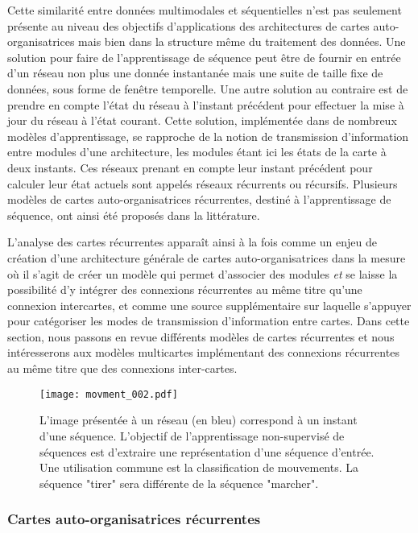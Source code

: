 \documentclass[../main]{subfiles}
\begin{document}
{Cette similarité entre données multimodales et séquentielles n'est pas seulement présente au niveau des objectifs d'applications des architectures de cartes auto-organisatrices mais bien dans la structure même du traitement des données. 
Une solution pour faire de l'apprentissage de séquence peut être de fournir en entrée d'un réseau non plus une donnée instantanée mais une suite de taille fixe de données, sous forme de fenêtre temporelle.
Une autre solution au contraire est de prendre en compte l'état du réseau à l'instant précédent pour effectuer la mise à jour du réseau à l'état courant. Cette solution, implémentée dans de nombreux modèles d'apprentissage, se rapproche de la notion de transmission d'information entre modules d'une architecture, les modules étant ici les états de la carte à deux instants. 
Ces réseaux prenant en compte leur instant précédent pour calculer leur état actuels sont appelés réseaux récurrents ou récursifs.
Plusieurs modèles de cartes auto-organisatrices récurrentes, destiné à l'apprentissage de séquence, ont ainsi été proposés dans la littérature.


L'analyse des cartes récurrentes apparaît ainsi à la fois comme un enjeu de création d'une architecture générale de cartes auto-organisatrices dans la mesure où il s'agit de créer un modèle qui permet d'associer des modules \emph{et} se laisse la possibilité d'y intégrer des connexions récurrentes au même titre qu'une connexion intercartes, et comme une source supplémentaire sur laquelle s'appuyer pour catégoriser les modes de transmission d'information entre cartes. Dans cette section, nous passons en revue différents modèles de cartes récurrentes et nous intéresserons aux modèles multicartes implémentant des connexions récurrentes au même titre que des connexions inter-cartes.

\begin{figure}
    \centering\texttt{[image: movment\_002.pdf]}
    \caption{L'image présentée à un réseau (en bleu) correspond à un instant d'une séquence. L'objectif de l'apprentissage non-supervisé de séquences est d'extraire une représentation d'une séquence d'entrée. Une utilisation commune est la classification de mouvements. La séquence "tirer" sera différente de la séquence "marcher".\label{fig:mouvement}}
 \end{figure}


\subsubsection{Cartes auto-organisatrices récurrentes}

}
\end{document}
